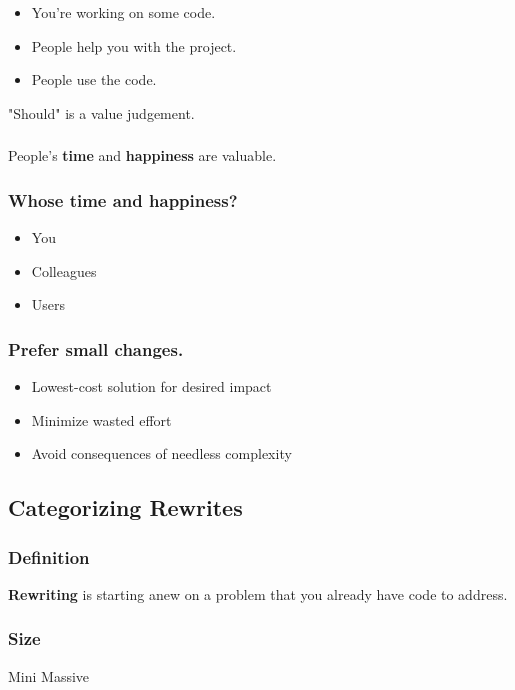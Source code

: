 \documentclass{beamer}
\begin{document}
\begin{frame}[fragile]
\frametitle{\insertsubsectionhead}
\begin{itemize}
\item You're working on some code.
\item People help you with the project.
\item People use the code.
\end{itemize}
\end{frame}

\begin{frame}[fragile]
"Should" is a value judgement.
\end{frame}

\begin{frame}[fragile]
\frametitle{\insertsubsectionhead}
People's \textbf{time} and \textbf{happiness} are valuable.
\end{frame}

\begin{frame}[fragile]
\frametitle{Whose time and happiness?}
\begin{itemize}
\item You
\item Colleagues
\item Users
\end{itemize}
\end{frame}

\begin{frame}[fragile]
\frametitle{Prefer small changes.}
\begin{itemize}
\item Lowest-cost solution for desired impact
\item Minimize wasted effort
\item Avoid consequences of needless complexity
\end{itemize}
\end{frame}


\subsection{Categorizing Rewrites}

\begin{frame}[fragile]
\frametitle{Definition}
\textbf{Rewriting} is starting anew on a problem that you already have code to
address.
\end{frame}

\begin{frame}[fragile]
\frametitle{Size}
Mini \hrulefill{5pt} Massive
\end{frame}
\end{document}
